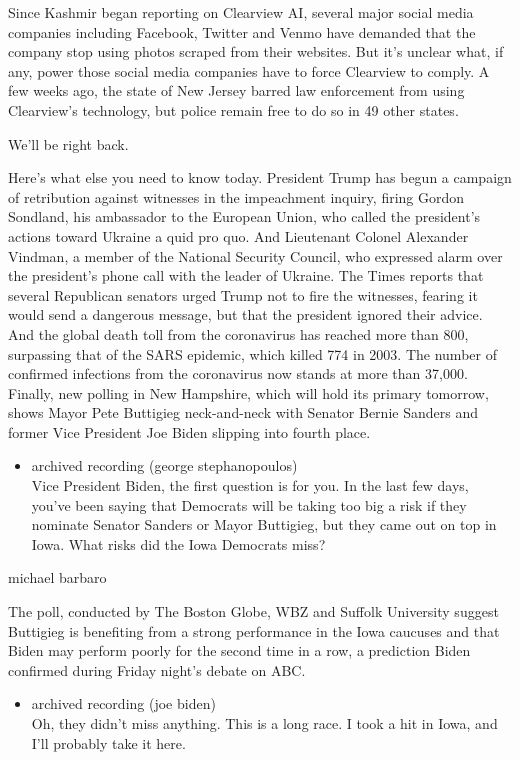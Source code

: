 Since Kashmir began reporting on Clearview AI, several major social
media companies including Facebook, Twitter and Venmo have demanded that
the company stop using photos scraped from their websites. But it's
unclear what, if any, power those social media companies have to force
Clearview to comply. A few weeks ago, the state of New Jersey barred law
enforcement from using Clearview's technology, but police remain free to
do so in 49 other states.

We'll be right back.

Here's what else you need to know today. President Trump has begun a
campaign of retribution against witnesses in the impeachment inquiry,
firing Gordon Sondland, his ambassador to the European Union, who called
the president's actions toward Ukraine a quid pro quo. And Lieutenant
Colonel Alexander Vindman, a member of the National Security Council,
who expressed alarm over the president's phone call with the leader of
Ukraine. The Times reports that several Republican senators urged Trump
not to fire the witnesses, fearing it would send a dangerous message,
but that the president ignored their advice. And the global death toll
from the coronavirus has reached more than 800, surpassing that of the
SARS epidemic, which killed 774 in 2003. The number of confirmed
infections from the coronavirus now stands at more than 37,000. Finally,
new polling in New Hampshire, which will hold its primary tomorrow,
shows Mayor Pete Buttigieg neck-and-neck with Senator Bernie Sanders and
former Vice President Joe Biden slipping into fourth place.

\begin{itemize}
\tightlist
\item
  archived recording (george stephanopoulos)\\
  Vice President Biden, the first question is for you. In the last few
  days, you've been saying that Democrats will be taking too big a risk
  if they nominate Senator Sanders or Mayor Buttigieg, but they came out
  on top in Iowa. What risks did the Iowa Democrats miss?
\end{itemize}

michael barbaro

The poll, conducted by The Boston Globe, WBZ and Suffolk University
suggest Buttigieg is benefiting from a strong performance in the Iowa
caucuses and that Biden may perform poorly for the second time in a row,
a prediction Biden confirmed during Friday night's debate on ABC.

\begin{itemize}
\tightlist
\item
  archived recording (joe biden)\\
  Oh, they didn't miss anything. This is a long race. I took a hit in
  Iowa, and I'll probably take it here.
\end{itemize}

